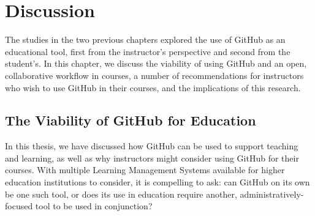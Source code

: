 \chapter{Discussion}
The studies in the two previous chapters explored the use of GitHub as an educational tool, first from the instructor's perspective and second from the student's. In this chapter, we discuss the viability of using GitHub and an open, collaborative workflow in courses, a number of recommendations for instructors who wish to use GitHub in their courses, and the implications of this research.

\section{The Viability of GitHub for Education}
In this thesis, we have discussed how GitHub can be used to support teaching and learning, as well as why instructors might consider using GitHub for their courses. With multiple Learning Management Systems available for higher education institutions to consider, it is compelling to ask: can GitHub on its own be one such tool, or does its use in education require another, administratively-focused tool to be used in conjunction?

